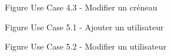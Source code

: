 \documentclass[a4paper, 11pt]{article}
\begin{document}
	\begin{figure}[h]
        \label{fig-diag-use-case-4-3}
        \caption{Figure Use Case 4.3 - Modifier un créneau}
        \end{figure}
        \clearpage
	\begin{figure}[!h]
        \caption{Figure Use Case 5.1 - Ajouter un utilisateur}
        \label{fig-diag-use-case-5-1}
        \end{figure}
	\begin{figure}[!h]
        \caption{Figure Use Case 5.2 - Modifier un utilisateur}
        \label{fig-diag-use-case-5-2}
        \end{figure}
	\clearpage
\end{document}
